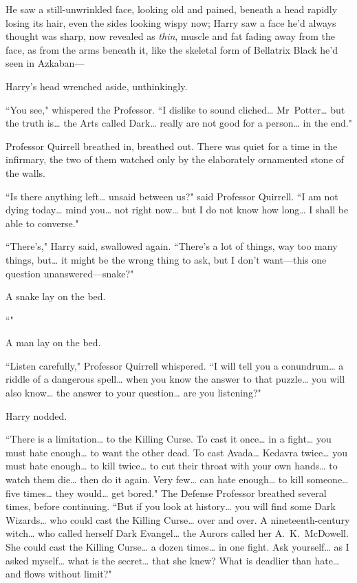 He saw a still-unwrinkled face, looking old and pained, beneath a head rapidly losing its hair, even the sides looking wispy now; Harry saw a face he'd always thought was sharp, now revealed as \emph{thin}, muscle and fat fading away from the face, as from the arms beneath it, like the skeletal form of Bellatrix Black he'd seen in Azkaban—

Harry's head wrenched aside, unthinkingly.

``You see," whispered the Professor. ``I dislike to sound cliched{\ldots} Mr~Potter{\ldots} but the truth is{\ldots} the Arts called Dark{\ldots} really are not good for a person{\ldots} in the end."

Professor Quirrell breathed in, breathed out. There was quiet for a time in the infirmary, the two of them watched only by the elaborately ornamented stone of the walls.

``Is there anything left{\ldots} unsaid between us?" said Professor Quirrell. ``I am not dying today{\ldots} mind you{\ldots} not right now{\ldots} but I do not know how long{\ldots} I shall be able to converse."

``There's," Harry said, swallowed again. ``There's a lot of things, way too many things, but{\ldots} it might be the wrong thing to ask, but I don't want—this one question unanswered—snake?"

A snake lay on the bed.

``"

A man lay on the bed.

``Listen carefully," Professor Quirrell whispered. ``I will tell you a conundrum{\ldots} a riddle of a dangerous spell{\ldots} when you know the answer to that puzzle{\ldots} you will also know{\ldots} the answer to your question{\ldots} are you listening?"

Harry nodded.

``There is a limitation{\ldots} to the Killing Curse. To cast it once{\ldots} in a fight{\ldots} you must hate enough{\ldots} to want the other dead. To cast Avada{\ldots} Kedavra twice{\ldots} you must hate enough{\ldots} to kill twice{\ldots} to cut their throat with your own hands{\ldots} to watch them die{\ldots} then do it again. Very few{\ldots} can hate enough{\ldots} to kill someone{\ldots} five times{\ldots} they would{\ldots} get bored." The Defense Professor breathed several times, before continuing. ``But if you look at history{\ldots} you will find some Dark Wizards{\ldots} who could cast the Killing Curse{\ldots} over and over. A nineteenth-century witch{\ldots} who called herself Dark Evangel{\ldots} the Aurors called her A.~K.~McDowell. She could cast the Killing Curse{\ldots} a dozen times{\ldots} in one fight. Ask yourself{\ldots} as I asked myself{\ldots} what is the secret{\ldots} that she knew? What is deadlier than hate{\ldots} and flows without limit?"

